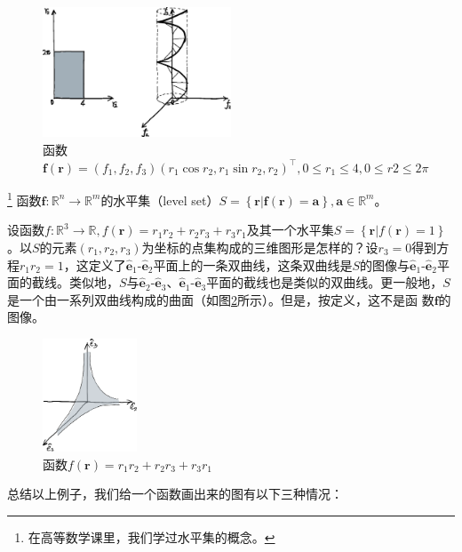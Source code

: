 \documentclass[main.tex]{subfiles}
\begin{document}
\begin{figure}[h]
    \centering
    \includegraphics[width=0.5\textwidth]{images/II.10.4.eps}
    \caption{函数$\mathbf{f}\left(\mathbf{r}\right)=\left(f_1,f_2,f_3\right)\left(r_1\cos r_2, r_1\sin r_2,r_2\right)^\intercal,0\leq r_1\leq 4,0\leq r2\leq 2\pi$}
    \label{fig:II.10.4}
\end{figure}
\begin{definition}[函数的水平集]\footnote{在高等数学课里，我们学过水平集的概念\cite[\S7.1,p~1] {华工高数2009下}。}
    函数$\mathbf{f}:\mathbb{R}^n\rightarrow\mathbb{R}^m$的水平集（level set）$S=\left\{\mathbf{r}|\mathbf{f}\left(\mathbf{r}\right)=\mathbf{a}\right\},\mathbf{a}\in\mathbb{R}^m$。
\end{definition}
\begin{example}\label{exp:II.12.8}
    设函数$f:\mathbb{R}^3\rightarrow\mathbb{R},f\left(\mathbf{r}\right)=r_1r_2+r_2r_3+r_3r_1$及其一个水平集$S=\left\{\mathbf{r}|f\left(\mathbf{r}\right)=1\right\}$。以$S$的元素$\left(r_1,r_2,r_3\right)$为坐标的点集构成的三维图形是怎样的？设$r_3=0$得到方程$r_1r_2=1$，这定义了$\mathbf{\hat{e}}_1$-$\mathbf{\hat{e}}_2$平面上的一条双曲线，这条双曲线是$S$的图像与$\mathbf{\hat{e}}_1$-$\mathbf{\hat{e}}_2$平面的截线。类似地，$S$与$\mathbf{\hat{e}}_2$-$\mathbf{\hat{e}}_3$、$\mathbf{\hat{e}}_1$-$\mathbf{\hat{e}}_3$平面的截线也是类似的双曲线。更一般地，$S$是一个由一系列双曲线构成的曲面（如图\ref{fig:II.10.5}所示）。但是，按定义，这不是函
    数$\mathbf{f}$的图像。
\end{example}
\begin{figure}[h]
    \centering
    \includegraphics[width=0.25\textwidth]{images/II.10.5.eps}
    \caption{函数$f\left(\mathbf{r}\right)=r_1r_2+r_2r_3+r_3r_1$}
    \label{fig:II.10.5}
\end{figure}
总结以上例子，我们给一个函数画出来的图有以下三种情况：
\end{document}
